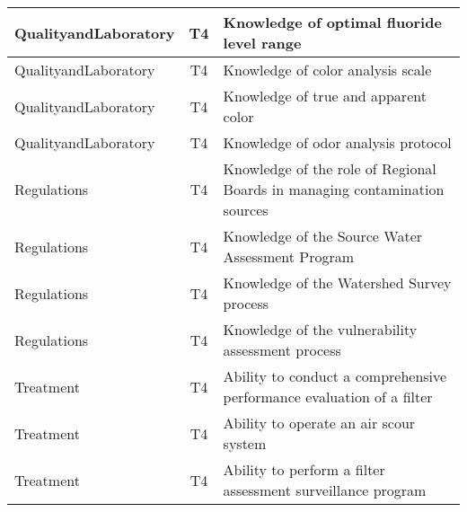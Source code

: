 \documentclass{article}
\begin{document}
\begin{table}[]
\begin{tabular}{|l|c|l|}
QualityandLaboratory                   & T4             & Knowledge of optimal   fluoride level range                                                                                       \\ \hline
QualityandLaboratory                   & T4             & Knowledge of color   analysis scale                                                                                               \\ \hline
QualityandLaboratory                   & T4             & Knowledge of true and   apparent color                                                                                            \\ \hline
QualityandLaboratory                   & T4             & Knowledge of odor   analysis protocol                                                                                             \\ \hline
Regulations                            & T4             & Knowledge of the role   of Regional Boards in managing contamination sources                                                      \\ \hline
Regulations                            & T4             & Knowledge of the   Source Water Assessment Program                                                                                \\ \hline
Regulations                            & T4             & Knowledge of the   Watershed Survey process                                                                                       \\ \hline
Regulations                            & T4             & Knowledge of the   vulnerability assessment process                                                                               \\ \hline
Treatment                              & T4             & Ability to conduct a   comprehensive performance evaluation of a filter                                                           \\ \hline
Treatment                              & T4             & Ability to operate an   air scour system                                                                                          \\ \hline
Treatment                              & T4             & Ability to perform a   filter assessment surveillance program                                                                     \\ \hline

\end{tabular}
\end{table}
\end{document}

